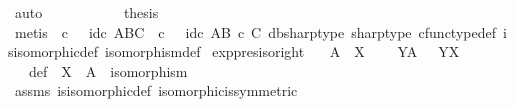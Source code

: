 \begin{isabellebody}
\ auto\isanewline
\ \ \ \ \isamarkupfalse%
\isanewline
\ \ \isamarkupfalse%
\isanewline
\ \ \isamarkupfalse%
\ {\isacharquery}{\kern0pt}thesis\isanewline
\ \ \ \ \isamarkupfalse%
\ {\isacharparenleft}{\kern0pt}metis\ {\isacartoucheopen}{\isasymphi}\isactrlsup {\isasymsharp}\isactrlsup {\isasymsharp}\ {\isasymcirc}\isactrlsub c\ {\isasympsi}\isactrlsup {\isasymsharp}\ {\isacharequal}{\kern0pt}\ id\isactrlsub c\ {\isacharparenleft}{\kern0pt}A\isactrlbsup B\isactrlesup \isactrlbsup C\isactrlesup {\isacharparenright}{\kern0pt}{\isacartoucheclose}\ {\isacartoucheopen}{\isasympsi}\isactrlsup {\isasymsharp}\ {\isasymcirc}\isactrlsub c\ {\isasymphi}\isactrlsup {\isasymsharp}\isactrlsup {\isasymsharp}\ {\isacharequal}{\kern0pt}\ id\isactrlsub c\ {\isacharparenleft}{\kern0pt}A\isactrlbsup {\isacharparenleft}{\kern0pt}B\ {\isasymtimes}\isactrlsub c\ C{\isacharparenright}{\kern0pt}\isactrlesup {\isacharparenright}{\kern0pt}{\isacartoucheclose}\ {\isasymphi}dbsharp{\isacharunderscore}{\kern0pt}type\ {\isasympsi}sharp{\isacharunderscore}{\kern0pt}type\ cfunc{\isacharunderscore}{\kern0pt}type{\isacharunderscore}{\kern0pt}def\ is{\isacharunderscore}{\kern0pt}isomorphic{\isacharunderscore}{\kern0pt}def\ isomorphism{\isacharunderscore}{\kern0pt}def{\isacharparenright}{\kern0pt}\isanewline
{}\isamarkupfalse%
%
\endisatagproof
{\isafoldproof}%
%
\isadelimproof
\isanewline
%
\endisadelimproof
\isanewline
{}\isamarkupfalse%
\ exp{\isacharunderscore}{\kern0pt}pres{\isacharunderscore}{\kern0pt}iso{\isacharunderscore}{\kern0pt}right{\isacharcolon}{\kern0pt}\isanewline
\ \ \ {\isachardoublequoteopen}A\ {\isasymcong}\ X{\isachardoublequoteclose}\ \isanewline
\ \ \ {\isachardoublequoteopen}Y\isactrlbsup A\isactrlesup \ {\isasymcong}\ \ Y\isactrlbsup X\isactrlesup {\isachardoublequoteclose}\isanewline
%
\isadelimproof
%
\endisadelimproof
%
\isatagproof
{}\isamarkupfalse%
\ {\isacharminus}{\kern0pt}\ \isanewline
\ \ \isamarkupfalse%
\ {\isasymphi}\ \ {\isasymphi}{\isacharunderscore}{\kern0pt}def{\isacharcolon}{\kern0pt}\ {\isachardoublequoteopen}{\isasymphi}{\isacharcolon}{\kern0pt}\ X\ {\isasymrightarrow}\ A\ {\isasymand}\ isomorphism{\isacharparenleft}{\kern0pt}{\isasymphi}{\isacharparenright}{\kern0pt}{\isachardoublequoteclose}\isanewline
\ \ \ \ \isamarkupfalse%
\ assms\ is{\isacharunderscore}{\kern0pt}isomorphic{\isacharunderscore}{\kern0pt}def\ isomorphic{\isacharunderscore}{\kern0pt}is{\isacharunderscore}{\kern0pt}symmetric\ \isamarkupfalse%

\end{isabellebody}
